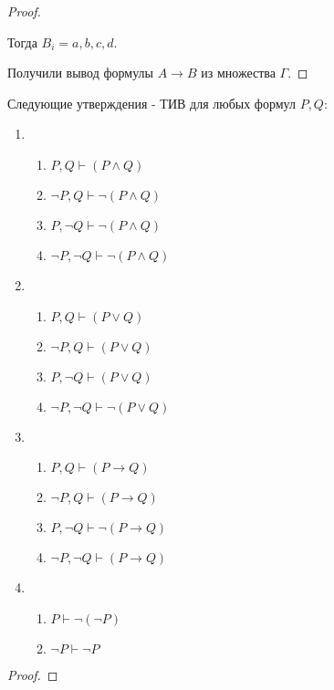 \begin{lemma}[О дедукции (DT)]
\begin{proof}
\begin{enumerate}
                Тогда $B_{i} = a,b,c,d$.
        \end{enumerate}

        Получили вывод формулы $A \to B$ из множества $\Gamma$.
    \end{proof}
\end{lemma}
\begin{lemma} \thmslashn

    Следующие утверждения - ТИВ для любых формул $P, Q$:

    \begin{enumerate}
        \item
            \begin{enumerate}
                \item $P, Q \vdash (P \land Q)$
                \item $\neg P, Q \vdash \neg (P \land Q)$
                \item $P, \neg Q \vdash \neg (P \land Q)$
                \item $\neg P, \neg Q \vdash \neg (P \land Q)$
            \end{enumerate}
        \item
            \begin{enumerate}
                \item $P, Q \vdash (P \lor Q)$
                \item $\neg P, Q \vdash (P \lor Q)$
                \item $P, \neg Q \vdash (P \lor Q)$
                \item $\neg P, \neg Q \vdash \neg (P \lor Q)$
            \end{enumerate}
        \item
            \begin{enumerate}
                \item $P, Q \vdash (P \to  Q)$
                \item $\neg P, Q \vdash (P \to  Q)$
                \item $P, \neg Q \vdash \neg (P \to Q)$
                \item $\neg P, \neg Q \vdash (P \to Q)$
            \end{enumerate}
        \item
            \begin{enumerate}
                \item $P \vdash \neg(\neg P)$
                \item  $\neg P \vdash \neg P$
            \end{enumerate}
    \end{enumerate}
    \begin{proof} \thmslashn
    
    \end{proof}
\end{lemma}
